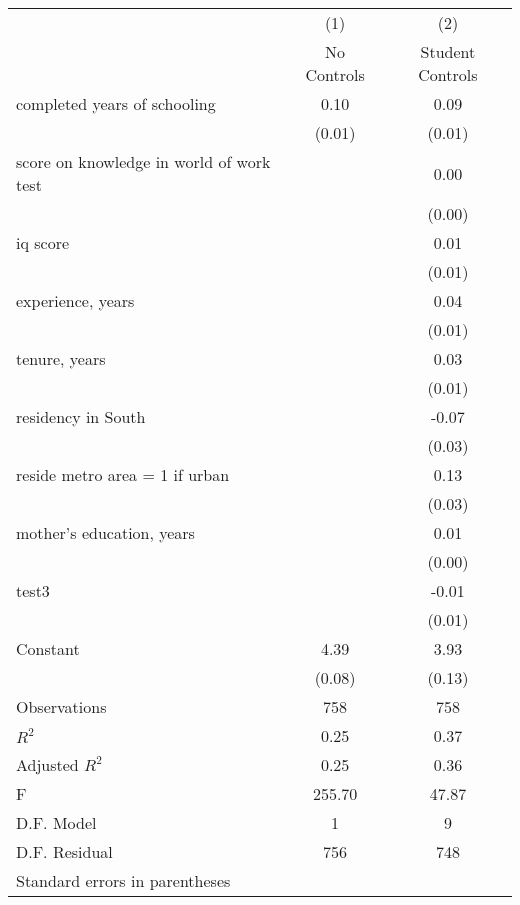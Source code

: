 \begin{tabular}{l*{2}{c}} \hline\hline
                    &\multicolumn{1}{c}{(1)}&\multicolumn{1}{c}{(2)}\\
                    &\multicolumn{1}{c}{No Controls}&\multicolumn{1}{c}{Student Controls}\\
\hline
completed years of schooling&        0.10&        0.09\\
                    &      (0.01)&      (0.01)\\
[1em]
score on knowledge in world of work test&            &        0.00\\
                    &            &      (0.00)\\
[1em]
iq score            &            &        0.01\\
                    &            &      (0.01)\\
[1em]
experience, years   &            &        0.04\\
                    &            &      (0.01)\\
[1em]
tenure, years       &            &        0.03\\
                    &            &      (0.01)\\
[1em]
residency in South  &            &       -0.07\\
                    &            &      (0.03)\\
[1em]
reside metro area = 1 if urban&            &        0.13\\
                    &            &      (0.03)\\
[1em]
mother's education, years&            &        0.01\\
                    &            &      (0.00)\\
[1em]
test3               &            &       -0.01\\
                    &            &      (0.01)\\
[1em]
Constant            &        4.39&        3.93\\
                    &      (0.08)&      (0.13)\\
\hline
Observations        &         758&         758\\
\(R^{2}\)           &        0.25&        0.37\\
Adjusted \(R^{2}\)  &        0.25&        0.36\\
F                   &      255.70&       47.87\\
D.F. Model          &           1&           9\\
D.F. Residual       &         756&         748\\
\hline\hline
\multicolumn{3}{l}{\footnotesize Standard errors in parentheses}\\
\end{tabular}
